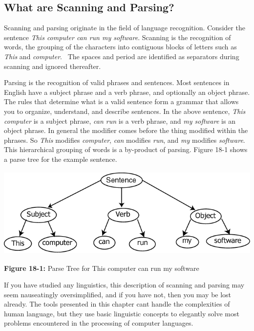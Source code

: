 \subsection{What are Scanning and Parsing?}
Scanning and parsing originate in the field of language recognition.
Consider the sentence \textit{This computer can run my software}.
Scanning is the recognition of words, the grouping of the characters
into contiguous blocks of letters such as \textit{This} and
\textit{computer}. \ The spaces and period are identified as separators
during scanning and ignored thereafter.

Parsing is the recognition of valid phrases and sentences. Most
sentences in English have a subject phrase and a verb phrase, and
optionally an object phrase. The rules that determine what is a valid
sentence form a grammar that allows you to organize, understand, and
describe sentences. In the above sentence, \textit{This computer} is a
subject phrase, \textit{can run} is a verb phrase, and \textit{my
software} is an object phrase. In general the modifier comes before the
thing modified within the phrases. So \textit{This} modifies
\textit{computer}, \textit{can} modifies \textit{run}, and \textit{my}
modifies \textit{software}. This hierarchical grouping of words is a
by-product of parsing. Figure 18-1 shows a parse tree for
the example sentence.


\bigskip

\begin{center}
\includegraphics[width=5.4362in,height=1.7846in]{ub-img/ub-img64.png}
\end{center}

{\sffamily\bfseries Figure 18-1:}
{\sffamily Parse Tree for {\textquotedbl}This computer can run my
software{\textquotedbl}}

\bigskip

If you have studied any linguistics, this description of scanning and
parsing may seem nauseatingly oversimplified, and if you have not, then
you may be lost already. The tools presented in this chapter
can{\textquotesingle}t handle the complexities of human language, but
they use basic linguistic concepts to elegantly solve most problems
encountered in the processing of computer languages.

